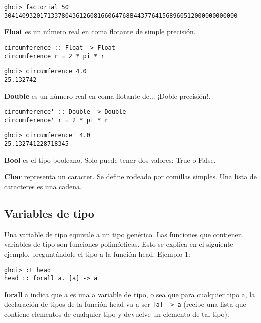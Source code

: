 \begin{lstlisting}
ghci> factorial 50
30414093201713378043612608166064768844377641568960512000000000000
\end{lstlisting}

\textbf{Float} es un número real en coma flotante de simple precisión.

\begin{lstlisting}
circumference :: Float -> Float
circumference r = 2 * pi * r
\end{lstlisting}

\begin{lstlisting}
ghci> circumference 4.0
25.132742
\end{lstlisting}

\textbf{Double} es un número real en coma flotante de... ¡Doble precisión!.

\begin{lstlisting}
circumference' :: Double -> Double
circumference' r = 2 * pi * r
\end{lstlisting}

\begin{lstlisting}
ghci> circumference' 4.0
25.132741228718345
\end{lstlisting}

\textbf{Bool} es el tipo booleano. Solo puede tener dos valores: True o False.

\textbf{Char} representa un caracter. Se define rodeado por comillas simples. Una lista de caracteres es una cadena.

\subsection{Variables de tipo} %
\label{sub:variables_de_tipo}

Una variable de tipo equivale a un tipo genérico. Las funciones que contienen variables de tipo son funciones polimórficas. Esto se explica en el siguiente ejemplo, preguntándole el tipo a la función head. Ejemplo 1:

\begin{lstlisting}
ghci> :t head
head :: forall a. [a] -> a
\end{lstlisting}

\textbf{forall} a indica que a es una a variable de tipo, o sea que para cualquier tipo a, la declaración de tipos de la función head va a ser  \lstinline$[a] -> a$ (recibe una lista que contiene elementos de cualquier tipo y devuelve un elemento de tal tipo).

